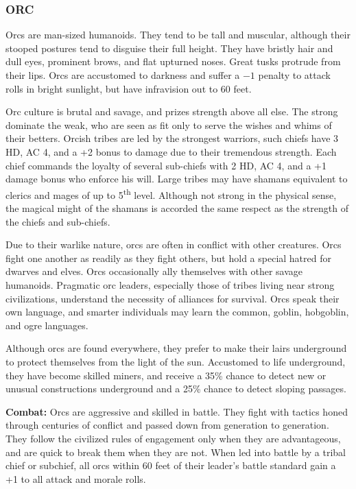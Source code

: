 \begin{multicols}{2}

\subsubsection{ORC}

Orcs are man-sized humanoids. They tend to be tall and muscular, although their stooped postures tend to disguise their full height. They have bristly hair and dull eyes, prominent brows, and flat upturned noses. Great tusks protrude from their lips. Orcs are accustomed to darkness and suffer a $-1$ penalty to attack rolls in bright sunlight, but have infravision out to 60 feet.

Orc culture is brutal and savage, and prizes strength above all else. The strong dominate the weak, who are seen as fit only to serve the wishes and whims of their betters. Orcish tribes are led by the strongest warriors, such chiefs have 3 HD, AC 4, and a +2 bonus to damage due to their tremendous strength. Each chief commands the loyalty of several sub-chiefs with 2 HD, AC 4, and a +1 damage bonus who enforce his will. Large tribes may have shamans equivalent to clerics and mages of up to 5\textsuperscript{th} level. Although not strong in the physical sense, the magical might of the shamans is accorded the same respect as the strength of the chiefs and sub-chiefs.

Due to their warlike nature, orcs are often in conflict with other creatures. Orcs fight one another as readily as they fight others, but hold a special hatred for dwarves and elves. Orcs occasionally ally themselves with other savage humanoids. Pragmatic orc leaders, especially those of tribes living near strong civilizations, understand the necessity of alliances for survival. Orcs speak their own language, and smarter individuals may learn the common, goblin, hobgoblin, and ogre languages.

Although orcs are found everywhere, they prefer to make their lairs underground to protect themselves from the light of the sun. Accustomed to life underground, they have become skilled miners, and receive a 35\% chance to detect new or unusual constructions underground and a 25\% chance to detect sloping passages.

\textbf{Combat:} Orcs are aggressive and skilled in battle. They fight with tactics honed through centuries of conflict and passed down from generation to generation. They follow the civilized rules of engagement only when they are advantageous, and are quick to break them when they are not. When led into battle by a tribal chief or subchief, all orcs within 60 feet of their leader's battle standard gain a +1 to all attack and morale rolls.


\end{multicols}
